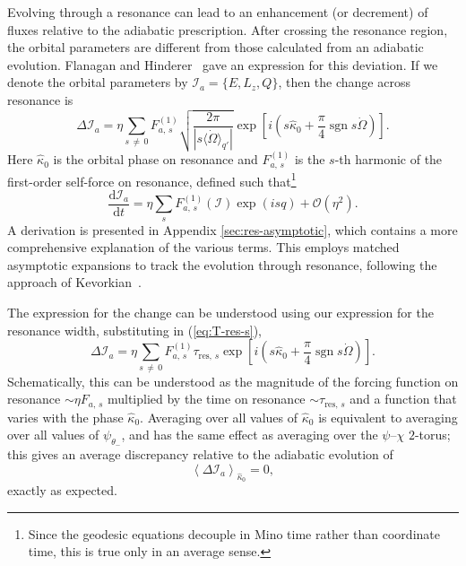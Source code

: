\documentclass[aps,prd,amsfonts,amssymb,amsmath,nofootinbib,reprint,showpacs]{revtex4}
\newcommand{\eqnref}[1]{(\ref{eq:#1})}
\newcommand{\apref}[1]{Appendix \ref{sec:#1}}
\newcommand{\dd}{\ensuremath{\mathrm{d}}}
\newcommand{\diff}[2]{\ensuremath{\dfrac{\dd {#1}}{\dd {#2}}}}
\newcommand{\order}[1]{\ensuremath{\mathcal{O}({#1})}}
\DeclareMathOperator{\sgn}{sgn}
\begin{document}
Evolving through a resonance can lead to an enhancement (or decrement) of fluxes relative to the adiabatic prescription. After crossing the resonance region, the orbital parameters are different from those calculated from an adiabatic evolution. Flanagan and Hinderer~\cite{Flanagan2012} gave an expression for this deviation. If we denote the orbital parameters by $\mathcal{I}_a = \{E,L_z,Q\}$, then the change across resonance is
\begin{equation}
\Delta \mathcal{I}_a = \eta\sum_{s\,\neq\,0}F_{a,\,s}^{(1)}\sqrt{\dfrac{2\pi}{\left|s \langle\dot{\Omega}\rangle_{q'}\right|}}\exp\left[i\left(s \widehat{\kappa}_0 + \dfrac{\pi}{4} \sgn s\dot{\Omega}\right)\right]. 
\end{equation}
Here $\widehat{\kappa}_0$ is the orbital phase on resonance and $F_{a,\,s}^{(1)}$ is the $s$-th harmonic of the first-order self-force on resonance, defined such that\footnote{Since the geodesic equations decouple in Mino time rather than coordinate time, this is true only in an average sense.}
\begin{equation}
\diff{\mathcal{I}_a}{t} = \eta\sum_s F_{a,\,s}^{(1)}(\boldsymbol{\mathcal{I}})\exp(is q) + \order{\eta^2}.
\end{equation}
A derivation is presented in \apref{res-asymptotic}, which contains a more comprehensive explanation of the various terms. This employs matched asymptotic expansions to track the evolution through resonance, following the approach of Kevorkian~\cite{Kevorkian1987}.

The expression for the change can be understood using our expression for the resonance width, substituting in \eqnref{T-res-s},
\begin{equation}
\label{eq:delta-I-a}
\Delta \mathcal{I}_a = \eta\sum_{s\,\neq\,0}F_{a,\,s}^{(1)}\tau_{\mathrm{res},\,s}\exp\left[i\left(s \widehat{\kappa}_0 + \dfrac{\pi}{4} \sgn s\dot{\Omega}\right)\right]. 
\end{equation}
Schematically, this can be understood as the magnitude of the forcing function on resonance $\sim \eta F_{a,\,s}$ multiplied by the time on resonance $\sim \tau_{\mathrm{res},\,s}$ and a function that varies with the phase $\widehat{\kappa}_0$. Averaging over all values of $\widehat{\kappa}_0$ is equivalent to averaging over all values of $\psi_{\theta_-}$, and has the same effect as averaging over the $\psi$--$\chi$ $2$-torus; this gives an average discrepancy relative to the adiabatic evolution of
\begin{equation}
\left\langle \Delta \mathcal{I}_a \right\rangle_{\hat{\kappa}_0} = 0,
\end{equation}
exactly as expected.
\end{document}
